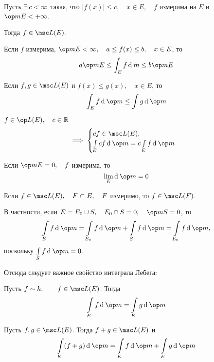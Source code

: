 \begin{props}
	\item Пусть $ \exists\, c < \infty $ такая, что $ |f(x)| \le c, \quad x \in E, \quad f $ измерима на $ E $ и $ \op m E < +\infty $.

	Тогда $ f \in \msc L(E) $.

	\item Если $ f $ измерима, $ \op m E < \infty, \quad a \le f(x) \le b, \quad x \in E $, то
	$$ a \op m E \le \int_E f \di m \le b \op m E $$

	\item Если $ f, g \in \msc L(E) $ и $ f(x) \le g(x), \quad x \in E $, то
	$$ \int_E f \di \op m \le \int g \di \op m $$

	\item $ f \in \op L(E), \quad c \in \R $
	$$ \implies
	\begin{cases}
		cf \in \msc L(E), \\
		\int\limits_E cf \di \op m = c \int\limits_E f \di \op m
	\end{cases} $$

	\item Если $ \op m E = 0, \quad f $ измерима, то
	$$ \lim\limits_E \di \op m = 0 $$

	\item Если $ f \in \msc L(E), \quad F \sub E, \quad F $ измеримо, то $ f \in \msc L(F) $.

	В частности, если $ E = E_0 \cup S, \quad E_0 \cap S = 0, \quad \op m S = 0 $, то
	$$ \int\limits_E f \di \op m = \int\limits_{E_0} f \di \op m + \int\limits_S f \di \op m = \int\limits_{E_0} f \di \op m, $$
	поскольку $ \int\limits_S f \di \op m = 0 $.

	Отсюда следует важное свойство интеграла Лебега:

	\item Пусть $ f \sim h, \qquad f \in \msc L(E) $. Тогда
	$$ \int\limits_E f \di \op m = \int\limits_E g \di \op m $$

	\item Пусть $ f, g \in \msc L(E) $. Тогда $ f + g \in \msc L(E) $ и
	$$ \int\limits_E (f + g) \di \op m = \int\limits_E f \di \op m + \int\limits_E g \di \op m $$
\end{props}


